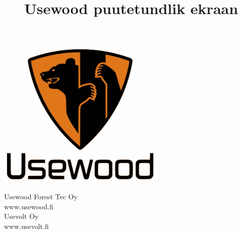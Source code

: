 \documentclass[12pt,a4paper,english]{uvmanual}
\title{Usewood puutetundlik ekraan}
\begin{document}
%	
\thispagestyle{empty}
\vspace*{-1cm}\noindent
\begin{center}
\includegraphics[width=8cm]{img/uw_logo_color.png}   %
\end{center}
\vspace{1cm}
\begin{center}
\end{center}



\vspace{2.8cm}
\maketitle
\vspace{2.8cm}


\begin{minipage}[c]{8.8cm}
  \begin{spacing}{1.0}
    \textsf{Usewood Forest Tec Oy}\\
    \textsf{www.usewood.fi}\\
    \textsf{Usevolt Oy}\\
    \textsf{www.usevolt.fi}\\
  \end{spacing}
\end{minipage}

\if@twoside
\clearpage
\fi

\setcounter{page}{0} %
\end{document}
